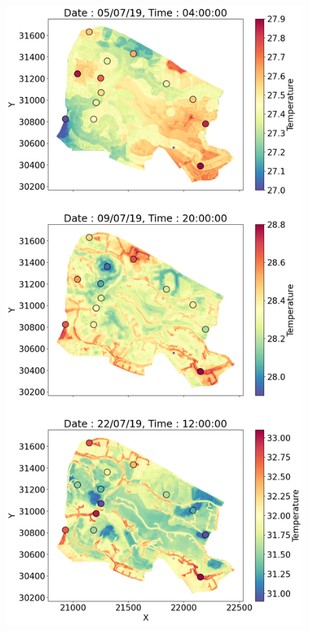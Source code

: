 \documentclass[a4paper,fleqn]{cas-sc}
\begin{document}
\begin{figure}[!h]
	\centering
	\includegraphics[scale=0.3]{figs/new_figs/tem_campusplot.png}

\end{figure}
\end{document}
